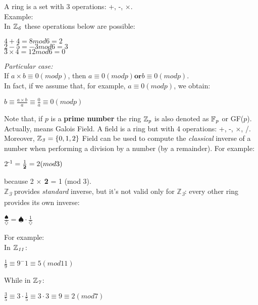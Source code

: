 \documentclass{article}
\begin{document}
A ring is a set with 3 operations: +, -, $\times$.\\
Example:\\
In $\mathbb{Z}\textsubscript{\textit{6}}$ these operations below are possible:\\
\begin{center}
$4 + 4 = 8mod6 = 2$\\
$2 - 5 = -3mod6 = 3$\\
$3 \times 4 = 12mod6 = 0$
\end{center}

\textit{Particular case:}\\
If $a \times b \equiv 0 (mod p)$, then $a \equiv 0 (mod p)         \textbf{or}  b \equiv 0 (mod p)$.\\ In fact, if we assume that, for example, $a \equiv 0 (mod p)$, we obtain:\\
\begin{center}
$b \equiv \frac{a \times b}{a} \equiv \frac{0}{a} \equiv 0 (mod p)$\\
\end{center}

Note that, if $p$ is a \textbf{prime number} the ring $\mathbb{Z}\textsubscript{\textit{p}}$ is also denoted as $\mathbb{F}\textsubscript{\textit{p}}$ or GF($p$). Actually, means Galois Field. A field is a ring but with 4 operations: +, -, $\times$, /.\\

Moreover, $\mathbb{Z}\textsubscript{\textit{3}} = \{0,1,2\}$ Field can be used to compute the \textit{classical} inverse of a number when performing a division by a number (by a remainder). For example: \\
\begin{center}
$2\textsuperscript{-1} = \frac{1}{\textbf{2}} = 2 (mod 3)$
\end{center}
because 2 \textbf{$\times$ 2} = 1 (mod 3).\\

$\mathbb{Z}$\textsubscript{\textit{3}} provides \textit{standard} inverse, but it's not valid only for $\mathbb{Z}$\textsubscript{\textit{3}}: every other ring provides its own inverse:\\
\begin{center}
$\frac{\spadesuit}{\diamondsuit} = \spadesuit \cdot \frac{1}{\diamondsuit}$
\end{center}

For example:\\
In $\mathbb{Z}\textsubscript{\textit{11}}$:
\begin{center}
$\frac{1}{9} \equiv 9^-1 \equiv 5 (mod 11)$
\end{center}
While in $\mathbb{Z}\textsubscript{\textit{7}}$:
\begin{center}
$\frac{3}{5} \equiv 3 \cdot \frac{1}{5} \equiv 3 \cdot 3 \equiv 9 \equiv 2 (mod 7)$
\end{center}
\end{document}
